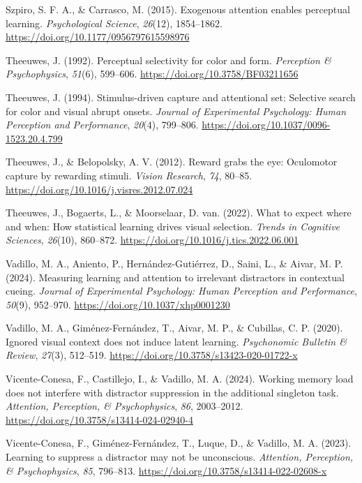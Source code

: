 \documentclass[
  man,
  floatsintext,
  longtable,
  nolmodern,
  notxfonts,
  notimes,
  mask,
  colorlinks=true,linkcolor=blue,citecolor=blue,urlcolor=blue]{apa7}
\newlength{\cslhangindent}
\newenvironment{CSLReferences}[2] %
 {\begin{list}{}{%
  \setlength{\itemindent}{0pt}
  \setlength{\leftmargin}{0pt}
  \setlength{\parsep}{0pt}
  \ifodd #1
   \setlength{\leftmargin}{\cslhangindent}
   \setlength{\itemindent}{-1\cslhangindent}
  \fi
  \setlength{\itemsep}{#2\baselineskip}}}
 {\end{list}}
\begin{document}
\begin{CSLReferences}{1}{0}
Szpiro, S. F. A., \& Carrasco, M. (2015). Exogenous attention enables
perceptual learning. \emph{Psychological Science}, \emph{26}(12),
1854--1862. \url{https://doi.org/10.1177/0956797615598976}

Theeuwes, J. (1992). Perceptual selectivity for color and form.
\emph{Perception \& Psychophysics}, \emph{51}(6), 599--606.
\url{https://doi.org/10.3758/BF03211656}

Theeuwes, J. (1994). Stimulus-driven capture and attentional set:
Selective search for color and visual abrupt onsets. \emph{Journal of
Experimental Psychology: Human Perception and Performance},
\emph{20}(4), 799--806. \url{https://doi.org/10.1037/0096-1523.20.4.799}

Theeuwes, J., \& Belopolsky, A. V. (2012). Reward grabs the eye:
Oculomotor capture by rewarding stimuli. \emph{Vision Research},
\emph{74}, 80--85. \url{https://doi.org/10.1016/j.visres.2012.07.024}

Theeuwes, J., Bogaerts, L., \& Moorselaar, D. van. (2022). What to
expect where and when: How statistical learning drives visual selection.
\emph{Trends in Cognitive Sciences}, \emph{26}(10), 860--872.
\url{https://doi.org/10.1016/j.tics.2022.06.001}

Vadillo, M. A., Aniento, P., Hernández-Gutiérrez, D., Saini, L., \&
Aivar, M. P. (2024). Measuring learning and attention to irrelevant
distractors in contextual cueing. \emph{Journal of Experimental
Psychology: Human Perception and Performance}, \emph{50}(9), 952--970.
\url{https://doi.org/10.1037/xhp0001230}

Vadillo, M. A., Giménez-Fernández, T., Aivar, M. P., \& Cubillas, C. P.
(2020). Ignored visual context does not induce latent learning.
\emph{Psychonomic Bulletin \& Review}, \emph{27}(3), 512--519.
\url{https://doi.org/10.3758/s13423-020-01722-x}

Vicente-Conesa, F., Castillejo, I., \& Vadillo, M. A. (2024). Working
memory load does not interfere with distractor suppression in the
additional singleton task. \emph{Attention, Perception, \&
Psychophysics}, \emph{86}, 2003--2012.
\url{https://doi.org/10.3758/s13414-024-02940-4}

Vicente-Conesa, F., Giménez-Fernández, T., Luque, D., \& Vadillo, M. A.
(2023). Learning to suppress a distractor may not be unconscious.
\emph{Attention, Perception, \& Psychophysics}, \emph{85}, 796--813.
\url{https://doi.org/10.3758/s13414-022-02608-x}


\end{CSLReferences}
\end{document}
